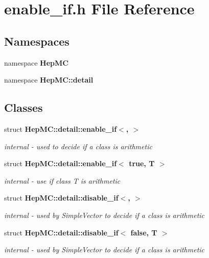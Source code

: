 \section{enable\_\-if.h File Reference}
\label{enable__if_8h}
\subsection*{Namespaces}
\begin{CompactItemize}
\item 
namespace {\bf Hep\-MC}
\item 
namespace {\bf Hep\-MC::detail}
\end{CompactItemize}
\subsection*{Classes}
\begin{CompactItemize}
\item 
struct {\bf Hep\-MC::detail::enable\_\-if$<$, $>$}
\begin{CompactList}\small\item\em internal - used to decide if a class is arithmetic \item\end{CompactList}\item 
struct {\bf Hep\-MC::detail::enable\_\-if$<$ true, T $>$}
\begin{CompactList}\small\item\em internal - use if class T is arithmetic \item\end{CompactList}\item 
struct {\bf Hep\-MC::detail::disable\_\-if$<$, $>$}
\begin{CompactList}\small\item\em internal - used by Simple\-Vector to decide if a class is arithmetic \item\end{CompactList}\item 
struct {\bf Hep\-MC::detail::disable\_\-if$<$ false, T $>$}
\begin{CompactList}\small\item\em internal - used by Simple\-Vector to decide if a class is arithmetic \item\end{CompactList}\end{CompactItemize}
